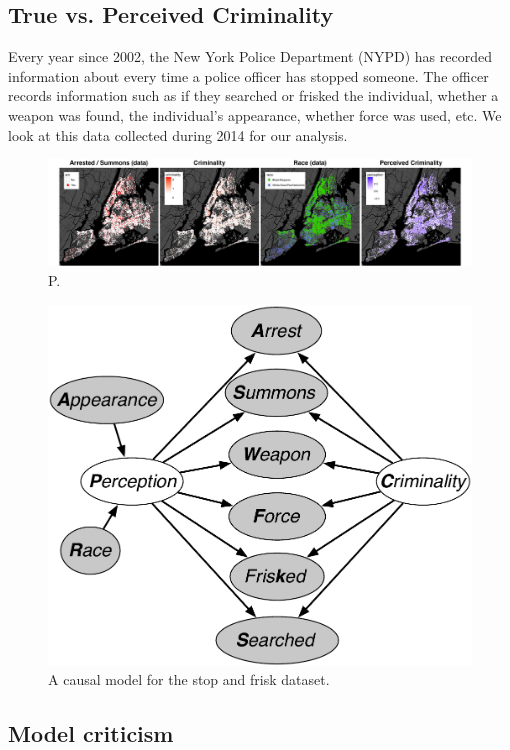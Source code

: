 \subsection{True vs. Perceived Criminality}
Every year since 2002, the New York Police Department (NYPD) has recorded information about every time a police officer has stopped someone. The officer records information such as if they searched or frisked the individual, whether a weapon was found, the individual's appearance, whether force was used, etc. We look at this data collected during 2014 for our analysis.

\begin{figure}[th!]
\begin{center}
\vspace{-2ex}
\centerline{\includegraphics[width=\textwidth]{stop_and_frisk_graphs.png}}
\vspace{-2ex}
\caption{P.}
\label{figure.criminality}
\vspace{-2ex}
\end{center}
\end{figure}

\begin{figure}[th]
\begin{center}
\vspace{-1ex}
\centerline{\includegraphics[width=\columnwidth]{stop_and_frisk_model3.pdf}}
\vspace{-2ex}
\caption{A causal model for the stop and frisk dataset.\label{figure.stop_and_frisk}}
\vspace{-2ex}
\end{center}
\end{figure}


\subsection{Model criticism}
